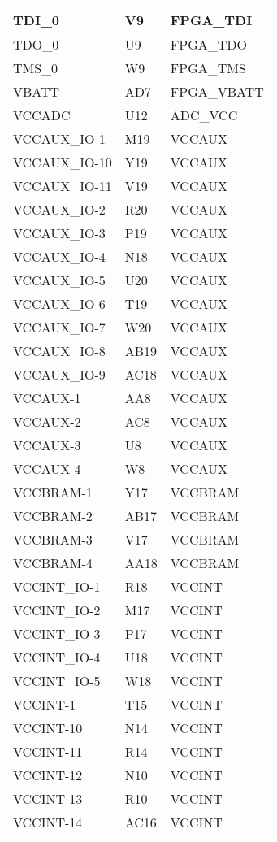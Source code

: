\begin{footnotesize}
\begin{longtable}{|p{7cm}|p{1cm}|p{5cm}|}
TDI\_0	&	V9	&	FPGA\_TDI	\\ \hline
TDO\_0	&	U9	&	FPGA\_TDO	\\ \hline
TMS\_0	&	W9	&	FPGA\_TMS	\\ \hline
VBATT	&	AD7	&	FPGA\_VBATT	\\ \hline
VCCADC	&	U12	&	ADC\_VCC	\\ \hline
VCCAUX\_IO-1	&	M19	&	VCCAUX	\\ \hline
VCCAUX\_IO-10	&	Y19	&	VCCAUX	\\ \hline
VCCAUX\_IO-11	&	V19	&	VCCAUX	\\ \hline
VCCAUX\_IO-2	&	R20	&	VCCAUX	\\ \hline
VCCAUX\_IO-3	&	P19	&	VCCAUX	\\ \hline
VCCAUX\_IO-4	&	N18	&	VCCAUX	\\ \hline
VCCAUX\_IO-5	&	U20	&	VCCAUX	\\ \hline
VCCAUX\_IO-6	&	T19	&	VCCAUX	\\ \hline
VCCAUX\_IO-7	&	W20	&	VCCAUX	\\ \hline
VCCAUX\_IO-8	&	AB19	&	VCCAUX	\\ \hline
VCCAUX\_IO-9	&	AC18	&	VCCAUX	\\ \hline
VCCAUX-1	&	AA8	&	VCCAUX	\\ \hline
VCCAUX-2	&	AC8	&	VCCAUX	\\ \hline
VCCAUX-3	&	U8	&	VCCAUX	\\ \hline
VCCAUX-4	&	W8	&	VCCAUX	\\ \hline
VCCBRAM-1	&	Y17	&	VCCBRAM	\\ \hline
VCCBRAM-2	&	AB17	&	VCCBRAM	\\ \hline
VCCBRAM-3	&	V17	&	VCCBRAM	\\ \hline
VCCBRAM-4	&	AA18	&	VCCBRAM	\\ \hline
VCCINT\_IO-1	&	R18	&	VCCINT	\\ \hline
VCCINT\_IO-2	&	M17	&	VCCINT	\\ \hline
VCCINT\_IO-3	&	P17	&	VCCINT	\\ \hline
VCCINT\_IO-4	&	U18	&	VCCINT	\\ \hline
VCCINT\_IO-5	&	W18	&	VCCINT	\\ \hline
VCCINT-1	&	T15	&	VCCINT	\\ \hline
VCCINT-10	&	N14	&	VCCINT	\\ \hline
VCCINT-11	&	R14	&	VCCINT	\\ \hline
VCCINT-12	&	N10	&	VCCINT	\\ \hline
VCCINT-13	&	R10	&	VCCINT	\\ \hline
VCCINT-14	&	AC16	&	VCCINT	\\ \hline

\end{longtable}
\end{footnotesize}
